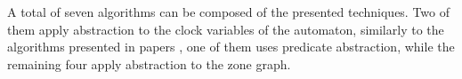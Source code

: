 A total of seven algorithms can be composed of the presented techniques. Two of them apply abstraction to the clock variables of the automaton, similarly to the algorithms presented in papers \cite{dierks2007automatic, he2010compositional,okano2011clock}, one of them uses predicate abstraction, while the remaining four apply abstraction to the zone graph. 



%















